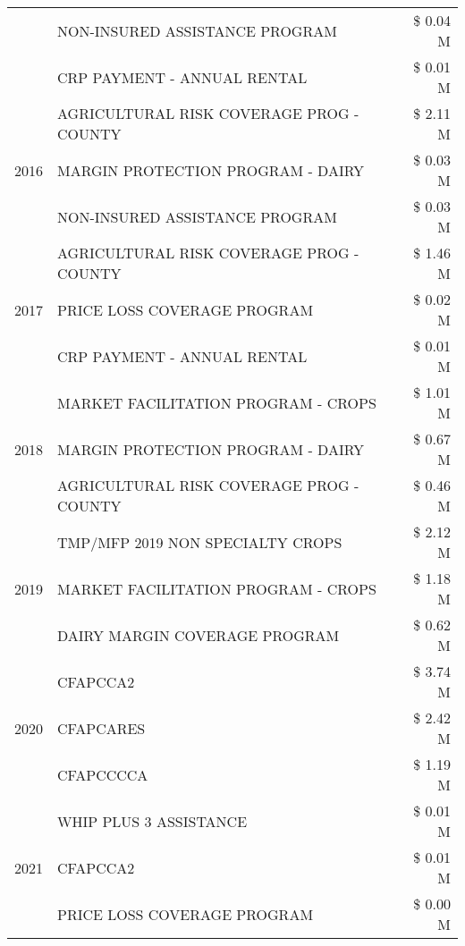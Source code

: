 \begin{tabular}{llr}
 & NON-INSURED ASSISTANCE PROGRAM & \$ 0.04 M \\
 & CRP PAYMENT - ANNUAL RENTAL & \$ 0.01 M \\
\cline{1-3}
\multirow[t]{3}{*}{2016} & AGRICULTURAL RISK COVERAGE PROG - COUNTY & \$ 2.11 M \\
 & MARGIN PROTECTION PROGRAM - DAIRY & \$ 0.03 M \\
 & NON-INSURED ASSISTANCE PROGRAM & \$ 0.03 M \\
\cline{1-3}
\multirow[t]{3}{*}{2017} & AGRICULTURAL RISK COVERAGE PROG - COUNTY & \$ 1.46 M \\
 & PRICE LOSS COVERAGE PROGRAM & \$ 0.02 M \\
 & CRP PAYMENT - ANNUAL RENTAL & \$ 0.01 M \\
\cline{1-3}
\multirow[t]{3}{*}{2018} & MARKET FACILITATION PROGRAM - CROPS & \$ 1.01 M \\
 & MARGIN PROTECTION PROGRAM - DAIRY & \$ 0.67 M \\
 & AGRICULTURAL RISK COVERAGE PROG - COUNTY & \$ 0.46 M \\
\cline{1-3}
\multirow[t]{3}{*}{2019} & TMP/MFP 2019 NON SPECIALTY CROPS & \$ 2.12 M \\
 & MARKET FACILITATION PROGRAM - CROPS & \$ 1.18 M \\
 & DAIRY MARGIN COVERAGE PROGRAM & \$ 0.62 M \\
\cline{1-3}
\multirow[t]{3}{*}{2020} & CFAPCCA2 & \$ 3.74 M \\
 & CFAPCARES & \$ 2.42 M \\
 & CFAPCCCCA & \$ 1.19 M \\
\cline{1-3}
\multirow[t]{3}{*}{2021} & WHIP PLUS 3 ASSISTANCE & \$ 0.01 M \\
 & CFAPCCA2 & \$ 0.01 M \\
 & PRICE LOSS COVERAGE PROGRAM & \$ 0.00 M \\
\cline{1-3}
\bottomrule
\end{tabular}
